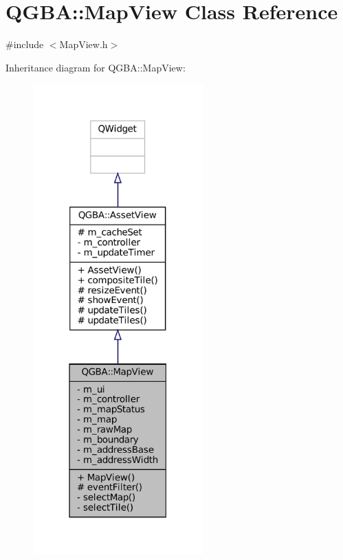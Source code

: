 \hypertarget{class_q_g_b_a_1_1_map_view}{}\section{Q\+G\+BA\+:\+:Map\+View Class Reference}
\label{class_q_g_b_a_1_1_map_view}


{\ttfamily \#include $<$Map\+View.\+h$>$}



Inheritance diagram for Q\+G\+BA\+:\+:Map\+View\+:
\nopagebreak
\begin{figure}[H]
\begin{center}
\leavevmode
\includegraphics[width=185pt]{class_q_g_b_a_1_1_map_view__inherit__graph}
\end{center}
\end{figure}


